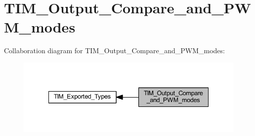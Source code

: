 \hypertarget{group___t_i_m___output___compare__and___p_w_m__modes}{}\section{T\+I\+M\+\_\+\+Output\+\_\+\+Compare\+\_\+and\+\_\+\+P\+W\+M\+\_\+modes}
\label{group___t_i_m___output___compare__and___p_w_m__modes}
Collaboration diagram for T\+I\+M\+\_\+\+Output\+\_\+\+Compare\+\_\+and\+\_\+\+P\+W\+M\+\_\+modes\+:
\nopagebreak
\begin{figure}[H]
\begin{center}
\leavevmode
\includegraphics[width=335pt]{group___t_i_m___output___compare__and___p_w_m__modes}
\end{center}
\end{figure}
